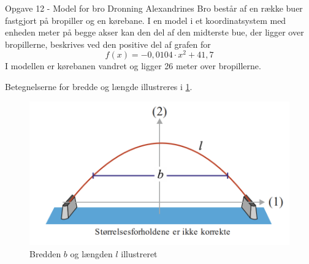 \documentclass{article}
\begin{document}
\begin{question}{Opgave 12 - Model for bro}{}
  Dronning Alexandrines Bro består af en række buer fastgjort på bropiller og en kørebane.
I en model i et koordinatsystem med enheden meter på begge akser kan den del af den midterste bue, der ligger over bropillerne, beskrives ved den positive del af grafen for 
\[
f(x)= -0,0104 \cdot x^2+ 41,7
\] 
I modellen er kørebanen vandret og ligger 26 meter over bropillerne.
\end{question}
Betegnelserne for bredde og længde illustreres i \cref{fig:bro}.
\begin{figure}[H]
\begin{center}
  \includegraphics[scale=1]{bro.png}
\end{center}
\caption{Bredden $b$ og længden $l$ illustreret }
\label{fig:bro}
\end{figure}
\end{document}

